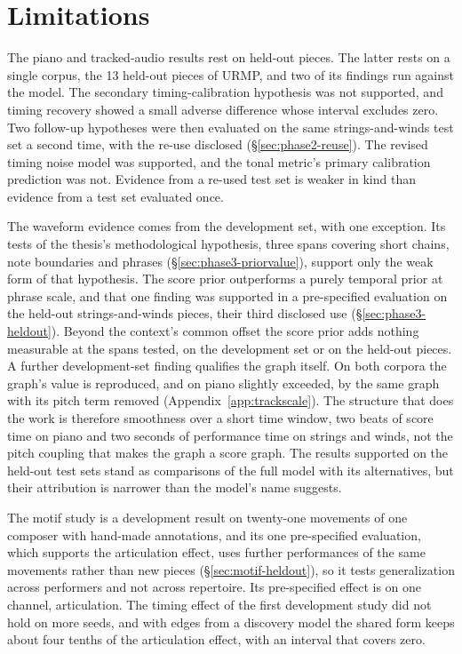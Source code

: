 \documentclass[11pt,a4paper]{report}
\begin{document}
\section{Limitations}
The piano and tracked-audio results rest on held-out pieces. The latter
rests
on a single corpus, the 13 held-out pieces of URMP, and two of its findings
run against the model. The secondary timing-calibration hypothesis was not
supported, and timing recovery showed a small adverse difference whose
interval excludes zero. Two follow-up hypotheses
were then evaluated on the same strings-and-winds test set a second time,
with the re-use disclosed (\S\ref{sec:phase2-reuse}). The revised timing
noise model was supported, and the tonal metric's primary calibration
prediction was not. Evidence from a re-used test set is weaker in kind than
evidence from a test set evaluated once.

The waveform evidence comes from the development set, with one exception.
Its tests of the thesis's methodological hypothesis, three spans
covering short chains, note boundaries and phrases
(\S\ref{sec:phase3-priorvalue}), support only the weak form of that
hypothesis. The score prior outperforms a purely temporal prior at phrase
scale, and that one finding was supported in a pre-specified evaluation
on the held-out strings-and-winds pieces, their third disclosed use
(\S\ref{sec:phase3-heldout}). Beyond the context's common offset the
score prior adds nothing measurable at the spans tested, on the
development set or on the held-out pieces. A further development-set finding qualifies the graph
itself. On both corpora the graph's value is reproduced, and on piano
slightly exceeded, by the same graph with its pitch term removed
(Appendix~\ref{app:trackscale}). The structure that does the work is
therefore smoothness over a short time window, two beats of score time on
piano and two seconds of performance time on strings and winds, not the
pitch coupling that makes the graph a score graph. The results supported on the
held-out test sets stand as comparisons of the full model with its
alternatives, but their attribution is narrower than the model's name
suggests.

The motif study is a development result on twenty-one movements of one
composer with hand-made annotations, and its one pre-specified evaluation,
which supports the articulation effect, uses further performances of the
same movements rather than new pieces (\S\ref{sec:motif-heldout}), so it
tests generalization across performers and not across repertoire. Its
pre-specified effect is on one channel, articulation. The timing effect of
the first development study did not hold on more seeds, and with edges
from a discovery model the shared form keeps about four tenths of the
articulation effect, with an interval that covers zero.
\end{document}
